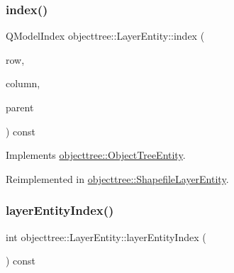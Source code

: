 \mbox{\label{classobjecttree_1_1_layer_entity_a168d47ed5cdde5455a5b0f124cbee0a9}} 
\subsubsection{\texorpdfstring{index()}{index()}}
{\footnotesize\ttfamily Q\+Model\+Index objecttree\+::\+Layer\+Entity\+::index (\begin{DoxyParamCaption}\item[{int}]{row,  }\item[{int}]{column,  }\item[{const Q\+Model\+Index \&}]{parent }\end{DoxyParamCaption}) const\hspace{0.3cm}{\ttfamily [virtual]}}



Implements \mbox{\hyperlink{classobjecttree_1_1_object_tree_entity_a9ccaab3b27e65b1ed8b22f00c57a1082}{objecttree\+::\+Object\+Tree\+Entity}}.



Reimplemented in \mbox{\hyperlink{classobjecttree_1_1_shapefile_layer_entity_a05d31fc56c4c57c919bd1bab7fd31ca9}{objecttree\+::\+Shapefile\+Layer\+Entity}}.

\mbox{\label{classobjecttree_1_1_layer_entity_a4f7c60c97a80aa01905acceb66755b77}} 
\subsubsection{\texorpdfstring{layerEntityIndex()}{layerEntityIndex()}}
{\footnotesize\ttfamily int objecttree\+::\+Layer\+Entity\+::layer\+Entity\+Index (\begin{DoxyParamCaption}{ }\end{DoxyParamCaption}) const\hspace{0.3cm}{\ttfamily [inline]}}

\mbox{\label{classobjecttree_1_1_layer_entity_ae4a92e8de339e70177a37c7376e2880d}} 
